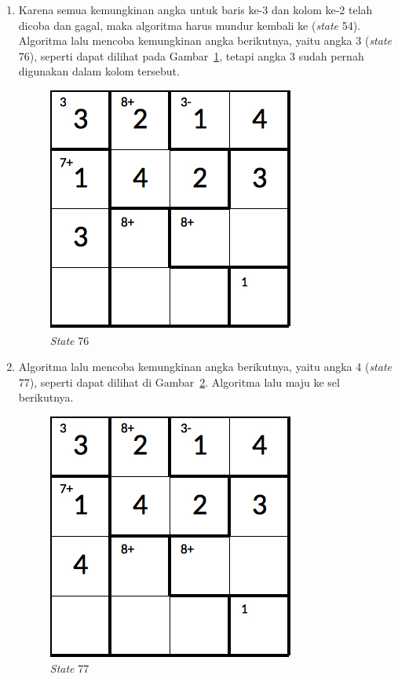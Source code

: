 \begin{enumerate}
\item Karena semua kemungkinan angka untuk baris ke-3 dan kolom ke-2 telah dicoba dan gagal, maka algoritma harus mundur kembali ke (\textit{state} 54). Algoritma lalu mencoba kemungkinan angka berikutnya, yaitu angka 3 (\textit{state} 76), seperti dapat dilihat pada Gambar~\ref{fig:analisisbt24}, tetapi angka 3 sudah pernah digunakan dalam kolom tersebut.

\begin{figure}
\centering
\captionsetup{justification=centering}
\includegraphics[scale=0.333]{Gambar/backtracking/State76}
\caption[\textit{State} 76]{\textit{State} 76}
\label{fig:analisisbt24}
\end{figure}

\item Algoritma lalu mencoba kemungkinan angka berikutnya, yaitu angka 4 (\textit{state} 77), seperti dapat dilihat di Gambar~\ref{fig:analisisbt25}. Algoritma lalu maju ke sel berikutnya.

\begin{figure}
\centering
\captionsetup{justification=centering}
\includegraphics[scale=0.333]{Gambar/backtracking/State77}
\caption[\textit{State} 77]{\textit{State} 77}
\label{fig:analisisbt25}
\end{figure}


\end{enumerate}
